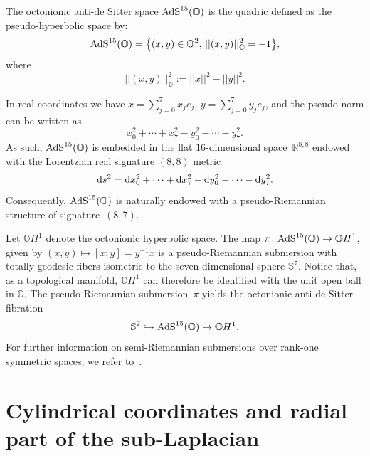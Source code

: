 \documentclass[pdftex]{sigma}
\numberwithin{equation}{section}
\begin{document}
The octonionic anti-de Sitter space ${\rm AdS}^{15}(\mathbb{O})$ is the quadric defined as the pseudo-hyperbolic space by:
\begin{equation*}
{\rm AdS}^{15}(\mathbb{O})=\big\{(x,y)\in\mathbb{O}^2, \, ||(x,y)||^2_{\mathbb{O}}=-1 \big\},
\end{equation*}
where
\begin{equation*}
||(x,y)||^2_{\mathbb{O}}:=||x||^2-||y||^2.
\end{equation*}

In real coordinates we have $x=\sum_{j=0}^{7}x_j e_j$, $y=\sum_{j=0}^{7}y_j e_j$, and the pseudo-norm can be written as
\begin{equation*}
x_0^2+\cdots +x_7^2-y_0^2-\cdots-y_7^2.
\end{equation*}
As such, ${\rm AdS}^{15}(\mathbb{O})$ is embedded in the flat $16$-dimensional space~$\mathbb{R}^{8,8}$ endowed with the Lo\-rentzian real signature $(8,8)$ metric
\begin{equation*}
{\rm d}s^2={\rm d}x_0^2+\dots+{\rm d}x_7^2-{\rm d}y_0^2-\cdots-{\rm d}y_7^2.
\end{equation*}
Consequently, ${\rm AdS}^{15}(\mathbb{O})$ is naturally endowed with a pseudo-Riemannian structure of signature~$(8,7)$.

Let $\mathbb{O}H^1$ denote the octonionic hyperbolic space. The map $\pi\colon {\rm AdS}^{15}(\mathbb{O}) \rightarrow \mathbb{O}H^1$, given by $(x,y) \mapsto [x:y]=y^{-1}x$ is a pseudo-Riemannian submersion with totally geodesic fibers isometric to the seven-dimensional sphere $\mathbb S^7$. Notice that, as a topological manifold, $\mathbb{O}H^1$ can therefore be identified with the unit open ball in $\mathbb{O}$. The pseudo-Riemannian submersion~$\pi$ yields the octonionic anti-de Sitter fibration
\begin{equation*}
\mathbb{S}^7 \hookrightarrow {\rm AdS}^{15}(\mathbb{O}) \rightarrow \mathbb{O}H^1.
\end{equation*}
For further information on semi-Riemannian submersions over rank-one symmetric spaces, we refer to~\cite{MR1877586}.

\section{Cylindrical coordinates and radial part of the sub-Laplacian}\label{section3}
\end{document}
